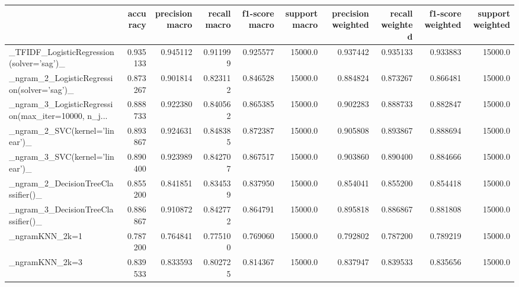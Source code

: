 \begin{tabular}{lrrrrrrrrr}
\toprule
{} &  accuracy &  precision macro &  recall macro &  f1-score macro &  support macro &  precision weighted &  recall weighted &  f1-score weighted &  support weighted \\
\midrule
\_TFIDF\_LogisticRegression(solver='sag')\_           &  0.935133 &         0.945112 &      0.911999 &        0.925577 &        15000.0 &            0.937442 &         0.935133 &           0.933883 &           15000.0 \\
\_ngram\_2\_LogisticRegression(solver='sag')\_         &  0.873267 &         0.901814 &      0.823112 &        0.846528 &        15000.0 &            0.884824 &         0.873267 &           0.866481 &           15000.0 \\
\_ngram\_3\_LogisticRegression(max\_iter=10000, n\_j... &  0.888733 &         0.922380 &      0.840562 &        0.865385 &        15000.0 &            0.902283 &         0.888733 &           0.882847 &           15000.0 \\
\_ngram\_2\_SVC(kernel='linear')\_                     &  0.893867 &         0.924631 &      0.848385 &        0.872387 &        15000.0 &            0.905808 &         0.893867 &           0.888694 &           15000.0 \\
\_ngram\_3\_SVC(kernel='linear')\_                     &  0.890400 &         0.923989 &      0.842707 &        0.867517 &        15000.0 &            0.903860 &         0.890400 &           0.884666 &           15000.0 \\
\_ngram\_2\_DecisionTreeClassifier()\_                 &  0.855200 &         0.841851 &      0.834539 &        0.837950 &        15000.0 &            0.854041 &         0.855200 &           0.854418 &           15000.0 \\
\_ngram\_3\_DecisionTreeClassifier()\_                 &  0.886867 &         0.910872 &      0.842772 &        0.864791 &        15000.0 &            0.895818 &         0.886867 &           0.881808 &           15000.0 \\
\_ngramKNN\_2k=1                                     &  0.787200 &         0.764841 &      0.775100 &        0.769060 &        15000.0 &            0.792802 &         0.787200 &           0.789219 &           15000.0 \\
\_ngramKNN\_2k=3                                     &  0.839533 &         0.833593 &      0.802725 &        0.814367 &        15000.0 &            0.837947 &         0.839533 &           0.835656 &           15000.0 \\

\end{tabular}
